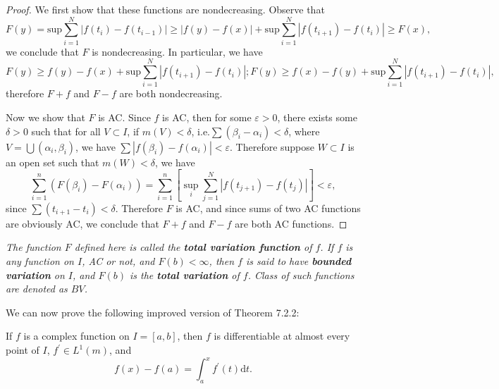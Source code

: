 \begin{proof}
We first show that these functions are nondecreasing. Observe that 
$$
F\left( y \right) =\mathrm{sup}\sum_{i=1}^N{\left| f\left( t_i \right) -f\left( t_{i-1} \right) \right|}\ge \left| f\left( y \right) -f\left( x \right) \right|+\mathrm{sup}\sum_{i=1}^N{\left| f\left( t_{i+1} \right) -f\left( t_i \right) \right|}\ge F\left( x \right) ,
$$
we conclude that $F$ is nondecreasing. In particular, we have 
$$
F\left( y \right) \ge f\left( y \right) -f\left( x \right) +\mathrm{sup}\sum_{i=1}^N{\left| f\left( t_{i+1} \right) -f\left( t_i \right) \right|}; F\left( y \right) \ge f\left( x \right) -f\left( y \right) +\mathrm{sup}\sum_{i=1}^N{\left| f\left( t_{i+1} \right) -f\left( t_i \right) \right|},
$$
therefore $F+f$ and $F-f$ are both nondecreasing.\par
Now we show that $F$ is AC. Since $f$ is AC, then for some $\varepsilon>0$, there exists some $\delta>0$ such that for all $V\subset I$, if $m(V)<\delta$, i.e.$\sum(\beta_i-\alpha_i)<\delta$, where $V=\bigcup(\alpha_i,\beta_i)$, we have $\sum|f(\beta_i)-f(\alpha_i)|<\varepsilon$. Therefore suppose $W\subset I$ is an open set such that $m(W)<\delta$, we have 
$$
\sum_{i=1}^n{\left( F\left( \beta _i \right) -F\left( \alpha _i \right) \right)}=\sum_{i=1}^n{\left[ \mathop {\mathrm{sup}} \limits_{i}\sum_{j=1}^N{\left| f\left( t_{j+1} \right) -f\left( t_j \right) \right|} \right]}<\varepsilon ,
$$
since $\sum(t_{i+1}-t_i)<\delta$. Therefore $F$ is AC, and since sums of two AC functions are obviously AC, we conclude that $F+f$ and $F-f$ are both AC functions.
\end{proof}
\begin{note}\em
The function $F$ defined here is called the \textbf{total variation function} of $f$. If $f$ is any function on $I$, AC or not, and $F(b)<\infty$, then $f$ is said to have \textbf{bounded variation} on $I$, and $F(b)$ is the \textbf{total variation} of $f$. Class of such functions are denoted as $BV$.
\end{note}
We can now prove the following improved version of Theorem 7.2.2:
\begin{theorem}
If $f$ is a complex function on $I=[a,b]$, then $f$ is differentiable at almost every point of $I$, $f^\prime\in L^1(m)$, and 
$$
f\left( x \right) -f\left( a \right) =\int_a^x{f^{\prime}\left( t \right) \mathrm{d}t}.
$$
\end{theorem}
